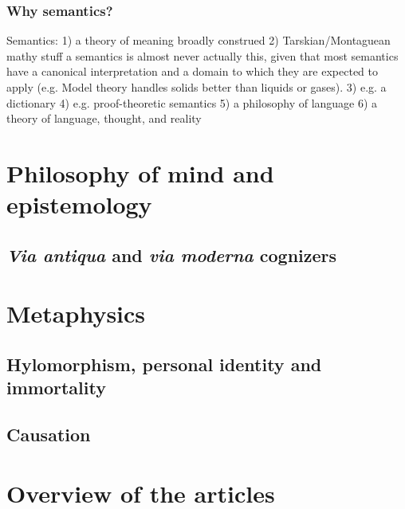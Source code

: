 \documentclass[]{article}
\begin{document}

\subsubsection{Why semantics?}
Semantics: 
1) a theory of meaning broadly construed
2) Tarskian/Montaguean mathy stuff
	a semantics is almost never actually this, given that most semantics have a canonical interpretation and a domain to which they are expected to apply (e.g. Model theory handles solids better than liquids or gases).
3) e.g. a dictionary
4) e.g. proof-theoretic semantics
5) a philosophy of language
6) a theory of language, thought, and reality


\section{Philosophy of mind and epistemology}
\subsection{\textit{Via antiqua} and \textit{via moderna} cognizers}
\section{Metaphysics}
\subsection{Hylomorphism, personal identity and immortality}
\subsection{Causation}
\section{Overview of the articles}

\printbibliography
\end{document}
